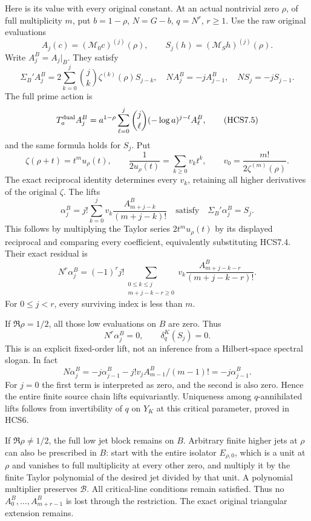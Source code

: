 Here is its value with every original constant. At an actual nontrivial
zero \(\rho\), of full multiplicity \(m\), put \(b=1-\rho\), \(N=G-b\),
\(q=N^r\), \(r\ge1\). Use the raw original evaluations \[
A_j(c)=(\mathcal M_0c)^{(j)}(\rho),\qquad
S_j(h)=(\mathcal M_Sh)^{(j)}(\rho).
\] Write \(A_j^B=A_j|_B\). They satisfy \[
\Sigma_B'A_j^B=
2\sum_{k=0}^j{j\choose k}\zeta^{(k)}(\rho)S_{j-k},
\quad NA_j^B=-jA_{j-1}^B,\quad NS_j=-jS_{j-1}.
\tag{HCS7.4}
\] The full prime action is \[
T_a^{\rm dual}A_j^B
=a^{1-\rho}\sum_{\ell=0}^j{j\choose\ell}
(-\log a)^{j-\ell}A_\ell^B,
\tag{HCS7.5}
\] and the same formula holds for \(S_j\). Put \[
\zeta(\rho+t)=t^m u_\rho(t),\qquad
\frac1{2u_\rho(t)}=\sum_{k\ge0}v_kt^k,\qquad
v_0=\frac{m!}{2\zeta^{(m)}(\rho)}.
\] The exact reciprocal identity determines every \(v_k\), retaining all
higher derivatives of the original \(\zeta\). The lifts \[
\alpha_j^B=j!\sum_{k=0}^j
v_k\frac{A_{m+j-k}^B}{(m+j-k)!}
\quad\text{satisfy}\quad\Sigma_B'\alpha_j^B=S_j.
\tag{HCS7.6}
\] This follows by multiplying the Taylor series \(2t^m u_\rho(t)\) by
its displayed reciprocal and comparing every coefficient, equivalently
substituting HCS7.4. Their exact residual is \[
N^r\alpha_j^B=(-1)^rj!\!
\sum_{\substack{0\le k\le j\\m+j-k-r\ge0}}
v_k\frac{A_{m+j-k-r}^B}{(m+j-k-r)!}.
\tag{HCS7.7}
\] For \(0\le j<r\), every surviving index is less than \(m\).

If \(\Re\rho=1/2\), all those low evaluations on \(B\) are zero. Thus \[
N^r\alpha_j^B=0,\qquad \delta_q^K(S_j)=0.
\tag{HCS7.8}
\] This is an explicit fixed-order lift, not an inference from a
Hilbert-space spectral slogan. In fact \[
N\alpha_j^B=-j\alpha_{j-1}^B
-j!v_j A_{m-1}^B/(m-1)!
=-j\alpha_{j-1}^B.
\tag{HCS7.9}
\] For \(j=0\) the first term is interpreted as zero, and the second is
also zero. Hence the entire finite source chain lifts equivariantly.
Uniqueness among \(q\)-annihilated lifts follows from invertibility of
\(q\) on \(Y_K\) at this critical parameter, proved in HCS6.

If \(\Re\rho\ne1/2\), the full low jet block remains on \(B\). Arbitrary
finite higher jets at \(\rho\) can also be prescribed in \(B\): start
with the entire isolator \(E_{\rho,0}\), which is a unit at \(\rho\) and
vanishes to full multiplicity at every other zero, and multiply it by
the finite Taylor polynomial of the desired jet divided by that unit. A
polynomial multiplier preserves \(\mathcal B\). All critical-line
conditions remain satisfied. Thus no \(A_0^B,\ldots,A_{m+r-1}^B\) is
lost through the restriction. The exact original triangular extension
remains.

